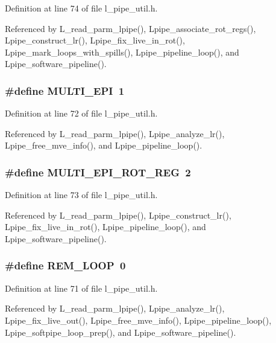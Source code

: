 Definition at line 74 of file l\_\-pipe\_\-util.h.

Referenced by L\_\-read\_\-parm\_\-lpipe(), Lpipe\_\-associate\_\-rot\_\-regs(), Lpipe\_\-construct\_\-lr(), Lpipe\_\-fix\_\-live\_\-in\_\-rot(), Lpipe\_\-mark\_\-loops\_\-with\_\-spills(), Lpipe\_\-pipeline\_\-loop(), and Lpipe\_\-software\_\-pipeline().
\subsubsection{\setlength{\rightskip}{0pt plus 5cm}\#define MULTI\_\-EPI~1}\label{l__pipe__util_8h_50a9671342717fc27f66fbb4178f4827}




Definition at line 72 of file l\_\-pipe\_\-util.h.

Referenced by L\_\-read\_\-parm\_\-lpipe(), Lpipe\_\-analyze\_\-lr(), Lpipe\_\-free\_\-mve\_\-info(), and Lpipe\_\-pipeline\_\-loop().
\subsubsection{\setlength{\rightskip}{0pt plus 5cm}\#define MULTI\_\-EPI\_\-ROT\_\-REG~2}\label{l__pipe__util_8h_82cbec0da6d1aaa4fc4326173c92f608}




Definition at line 73 of file l\_\-pipe\_\-util.h.

Referenced by L\_\-read\_\-parm\_\-lpipe(), Lpipe\_\-construct\_\-lr(), Lpipe\_\-fix\_\-live\_\-in\_\-rot(), Lpipe\_\-pipeline\_\-loop(), and Lpipe\_\-software\_\-pipeline().
\subsubsection{\setlength{\rightskip}{0pt plus 5cm}\#define REM\_\-LOOP~0}\label{l__pipe__util_8h_3225a520483e53a39cab55104dcd0e5a}




Definition at line 71 of file l\_\-pipe\_\-util.h.

Referenced by L\_\-read\_\-parm\_\-lpipe(), Lpipe\_\-analyze\_\-lr(), Lpipe\_\-fix\_\-live\_\-out(), Lpipe\_\-free\_\-mve\_\-info(), Lpipe\_\-pipeline\_\-loop(), Lpipe\_\-softpipe\_\-loop\_\-prep(), and Lpipe\_\-software\_\-pipeline().

